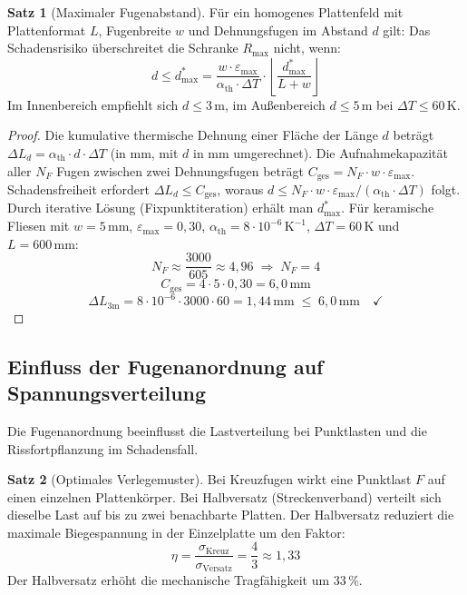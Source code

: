 ﻿\documentclass[a4paper,12pt]{article}
\theoremstyle{definition}
\newtheorem{satz}{Satz}
\begin{document}
\begin{satz}[Maximaler Fugenabstand]
	\label{satz:fugenabstand}
	Für ein homogenes Plattenfeld mit Plattenformat $L$, Fugenbreite $w$
	und Dehnungsfugen im Abstand $d$ gilt: Das Schadensrisiko überschreitet
	die Schranke $R_{\max}$ nicht, wenn:
	\[
	d \leq d^*_{\max} = \frac{w \cdot \varepsilon_{\max}}{\alpha_{\text{th}} \cdot \Delta T}
	\cdot \left\lfloor \frac{d^*_{\max}}{L + w} \right\rfloor
	\]
	Im Innenbereich empfiehlt sich $d \leq 3\,\text{m}$, im Außenbereich
	$d \leq 5\,\text{m}$ bei $\Delta T \leq 60\,\text{K}$.
\end{satz}

\begin{proof}
	Die kumulative thermische Dehnung einer Fläche der Länge $d$ beträgt
	$\Delta L_d = \alpha_{\text{th}} \cdot d \cdot \Delta T$ (in mm, mit
	$d$ in mm umgerechnet). Die Aufnahmekapazität aller $N_F$ Fugen zwischen
	zwei Dehnungsfugen beträgt $C_{\text{ges}} = N_F \cdot w \cdot \varepsilon_{\max}$.
	Schadensfreiheit erfordert $\Delta L_d \leq C_{\text{ges}}$, woraus
	$d \leq N_F \cdot w \cdot \varepsilon_{\max} / (\alpha_{\text{th}} \cdot \Delta T)$
	folgt. Durch iterative Lösung (Fixpunktiteration) erhält man $d^*_{\max}$.
	Für keramische Fliesen mit $w = 5\,\text{mm}$, $\varepsilon_{\max} = 0{,}30$,
	$\alpha_{\text{th}} = 8 \cdot 10^{-6}\,\text{K}^{-1}$, $\Delta T = 60\,\text{K}$
	und $L = 600\,\text{mm}$:
	\[
	N_F \approx \frac{3000}{605} \approx 4{,}96 \;\Rightarrow\; N_F = 4
	\]
	\[
	C_{\text{ges}} = 4 \cdot 5 \cdot 0{,}30 = 6{,}0\,\text{mm}
	\]
	\[
	\Delta L_{3\text{m}} = 8 \cdot 10^{-6} \cdot 3000 \cdot 60 = 1{,}44\,\text{mm}
	\;\leq\; 6{,}0\,\text{mm} \quad \checkmark
	\]
\end{proof}

\subsection{Einfluss der Fugenanordnung auf Spannungsverteilung}

Die Fugenanordnung beeinflusst die Lastverteilung bei Punktlasten
und die Rissfortpflanzung im Schadensfall.

\begin{satz}[Optimales Verlegemuster]
	\label{satz:muster}
	Bei Kreuzfugen wirkt eine Punktlast $F$ auf einen einzelnen
	Plattenkörper. Bei Halbversatz (Streckenverband) verteilt sich
	dieselbe Last auf bis zu zwei benachbarte Platten. Der Halbversatz
	reduziert die maximale Biegespannung in der Einzelplatte um den Faktor:
	\[
	\eta = \frac{\sigma_{\text{Kreuz}}}{\sigma_{\text{Versatz}}} = \frac{4}{3} \approx 1{,}33
	\]
	Der Halbversatz erhöht die mechanische Tragfähigkeit um $33\,\%$.
\end{satz}
\end{document}
